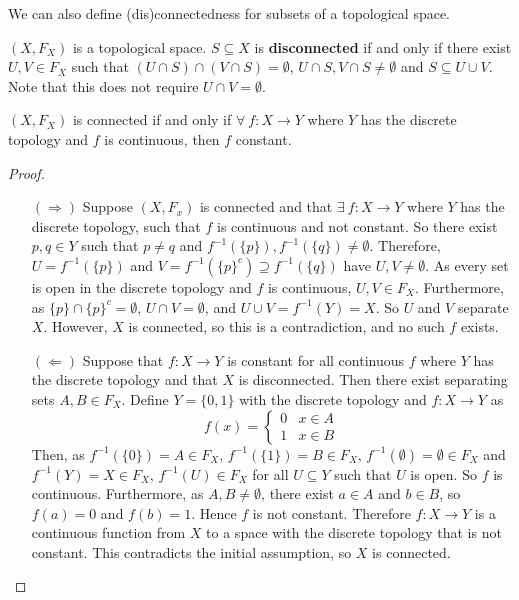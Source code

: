 We can also define (dis)connectedness for subsets of a topological space. 
\begin{definition}
	$(X,F_X)$ is a topological space. $S \subseteq X$ is \textbf{disconnected} if and only if there exist $U,V \in F_X$ such that $(U \cap S) \cap (V \cap S) = \emptyset$, $U \cap S, V \cap S \neq \emptyset$ and $S \subseteq U \cup V$. Note that this does not require $U \cap V = \emptyset$. 
\end{definition}
\begin{smallfact}
	$(X, F_X)$ is connected if and only if $\forall \ f : X \to Y$ where $Y$ has the discrete topology and $f$ is continuous, then $f$ constant. 
\end{smallfact}
\begin{proof}
	\begin{itemize}
		\item[$(\Rightarrow)$] Suppose $(X,F_x)$ is connected and that $\exists \ f : X \to Y$ where $Y$ has the discrete topology, such that $f$ is continuous and not constant. So there exist $p,q \in Y$ such that $p \neq q$ and $f^{-1}(\{p\}), f^{-1}(\{q\}) \neq \emptyset$. Therefore, $U = f^{-1}(\{p\})$ and $V = f^{-1}(\{p\}^c) \supseteq f^{-1}(\{q\})$ have $U,V \neq \emptyset$. As every set is open in the discrete topology and $f$ is continuous, $U,V \in F_X$. Furthermore, as $\{p\} \cap \{p\}^c = \emptyset$, $U \cap V = \emptyset$, and $U \cup V = f^{-1}(Y) = X$. So $U$ and $V$ separate $X$. However, $X$ is connected, so this is a contradiction, and no such $f$ exists. 
		\item[$(\Leftarrow)$] Suppose that $f : X \to Y$ is constant for all continuous $f$ where $Y$ has the discrete topology and that $X$ is disconnected. Then there exist separating sets $A,B \in F_X$. Define $Y = \{0,1\}$ with the discrete topology and $f : X \to Y$ as
		\[f(x) = \left\{ 
		\begin{array}{cc}
			0 & x \in A \\
			1 & x \in B
		\end{array}
		\right.\]
		Then, as $f^{-1}(\{0\}) = A \in F_X$, $f^{-1}(\{1\}) = B \in F_X$, $f^{-1}(\emptyset) = \emptyset \in F_X$ and $f^{-1}(Y) = X \in F_X$, $f^{-1}(U) \in F_X$ for all $U \subseteq Y$ such that $U$ is open. So $f$ is continuous. Furthermore, as $A,B \neq \emptyset$, there exist $a \in A$ and $b \in B$, so $f(a) = 0$ and $f(b) = 1$. Hence $f$ is not constant. Therefore $f : X \to Y$ is a continuous function from $X$ to a space with the discrete topology that is not constant. This contradicts the initial assumption, so $X$ is connected. 
	\end{itemize}
\end{proof}

